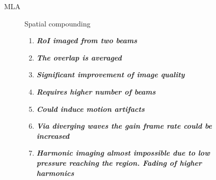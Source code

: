 \documentclass[t,12pt,english
\ifx\beamermode\undefined\else,\beamermode\fi
]{beamer}
\begin{document}
\begin{frame}{MLA }


\begin{figure}[!htb]


\begin{block}{\footnotesize{\tiny Spatial compounding \cite{5}}}\tiny{}
\begin{enumerate} 
\vspace{0.05cm}

     \item \tiny{\textbf{\textit{RoI imaged from two beams}}}
     \item \tiny{\textbf{\textit{The overlap is averaged}}}
     \item \tiny{\textbf{\textit{Significant improvement of image quality }}}
     \color{red}
     \item \tiny{\textbf{\textit{Requires higher number of beams}}}
     \item \tiny{\textbf{\textit{Could induce motion artifacts}}}
     \item \tiny{\textbf{\textit{Via diverging waves the gain frame rate could be increased}}}
     \item \tiny{\textbf{\textit{Harmonic imaging almost impossible due to low pressure reaching the region. Fading of higher harmonics}}}
     

\end{enumerate}
\end{block}
\end{figure}
\end{frame}
\end{document}
